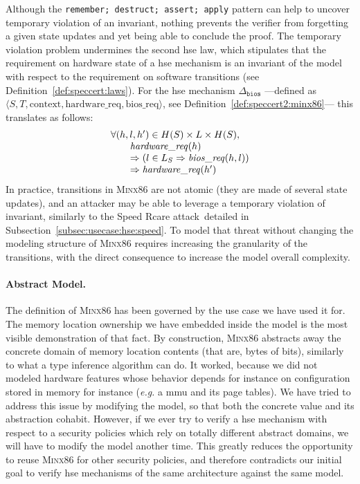 Although the \texttt{remember;~destruct;~assert;~apply} pattern can help to
uncover temporary violation of an invariant, nothing prevents the verifier from
forgetting a given state updates and yet being able to conclude the proof.
%
The temporary violation problem undermines the second \ac{hse} law, which
stipulates that the requirement on hardware state of a \ac{hse} mechanism is an
invariant of the model with respect to the requirement on software transitions
(see Definition~\ref{def:speccert:laws}).
%
For the \ac{hse} mechanism \( \Delta_{\mathtt{bios}} \) ---defined as
\( \langle S, T, \mathrm{context}, \mathrm{hardware\_req}, \mathrm{bios\_req}
\rangle \), see Definition~\ref{def:speccert2:minx86}--- this translates as
follows:
%
\[
  \begin{array}{l}
    \forall (h, l, h') \in H(S) \times L \times H(S), \\
    \qquad\mathit{hardware\_req}(h) \\
    \qquad\Rightarrow (l \in L_S \Rightarrow \mathit{bios\_req}(h, l)) \\
    \qquad\Rightarrow \mathit{hardware\_req}(h')
  \end{array}
\]
%
In practice, transitions in {\scshape Minx86} are not atomic (they are made of
several state updates), and an attacker may be able to leverage a temporary
violation of invariant, similarly to the Speed Rcare
attack\,\cite{kallenberg2015racecondition} detailed in
Subsection~\ref{subsec:usecase:hse:speed}.
%
To model that threat without changing the modeling structure of {\scshape
  Minx86} requires increasing the granularity of the transitions, with the
direct consequence to increase the model overall complexity.

\paragraph{Abstract Model.}
%
The definition of {\scshape Minx86} has been governed by the use case we have
used it for.
%
The memory location ownership we have embedded inside the model is the most
visible demonstration of that fact.
%
By construction, {\scshape Minx86} abstracts away the concrete domain of memory
location contents (that are, bytes of bits), similarly to what a type inference
algorithm can do.
%
It worked, because we did not modeled hardware features whose behavior depends
for instance on configuration stored in memory for instance (\emph{e.g.} a
\ac{mmu} and its page tables).
%
We have tried to address this issue by modifying the model, so that both the
concrete value and its abstraction cohabit.
%
However, if we ever try to verify a \ac{hse} mechanism with respect to a
security policies which rely on totally different abstract domains, we will have
to modify the model another time.
%
This greatly reduces the opportunity to reuse {\scshape Minx86} for other
security policies, and therefore contradicts our initial goal to verify \ac{hse}
mechanisms of the same architecture against the same model.

